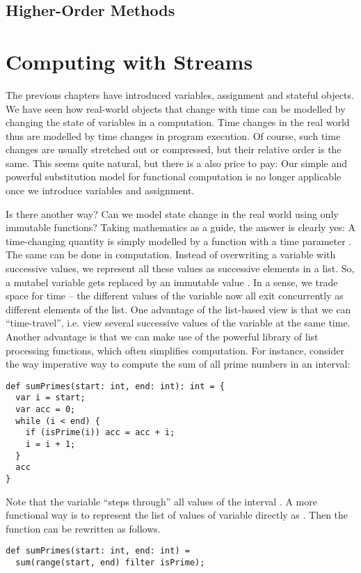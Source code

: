 \documentclass[a4paper,12pt,twoside,titlepage]{book}
\begin{document}
\section*{Higher-Order Methods}

\chapter{Computing with Streams}

The previous chapters have introduced variables, assignment and
stateful objects.  We have seen how real-world objects that change
with time can be modelled by changing the state of variables in a
computation.  Time changes in the real world thus are modelled by time
changes in program execution. Of course, such time changes are usually
stretched out or compressed, but their relative order is the same.
This seems quite natural, but there is a also price to pay: Our simple
and powerful substitution model for functional computation is no
longer applicable once we introduce variables and assignment.

Is there another way? Can we model state change in the real world
using only immutable functions? Taking mathematics as a guide, the
answer is clearly yes: A time-changing quantity is simply modelled by
a function  with a time parameter . The same can be
done in computation. Instead of overwriting a variable with successive
values, we represent all these values as successive elements in a
list. So, a mutabel variable  gets replaced by an
immutable value . In a sense, we trade space for
time -- the different values of the variable now all exit concurrently
as different elements of the list.  One advantage of the list-based
view is that we can ``time-travel'', i.e. view several successive
values of the variable at the same time. Another advantage is that we
can make use of the powerful library of list processing functions,
which often simplifies computation. For instance, consider the way
imperative way to compute the sum of all prime numbers in an interval:
\begin{lstlisting}
def sumPrimes(start: int, end: int): int = {
  var i = start;
  var acc = 0;
  while (i < end) {
    if (isPrime(i)) acc = acc + i;
    i = i + 1;
  }
  acc
}
\end{lstlisting}
Note that the variable  ``steps through'' all values of the interval
.
A more functional way is to represent the list of values of variable  directly as . Then the function can be rewritten as follows.
\begin{lstlisting}
def sumPrimes(start: int, end: int) =
  sum(range(start, end) filter isPrime);
\end{lstlisting}
\end{document}
